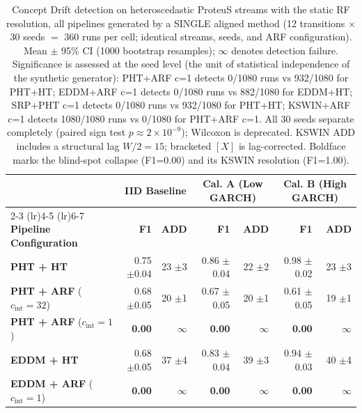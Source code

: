 \begin{table}[t]
  \centering
  \caption{Concept Drift detection on heteroscedastic ProteuS streams with the static RF resolution, all pipelines generated by a SINGLE aligned method (12 transitions $\times$ 30 seeds $=$ 360 runs per cell; identical streams, seeds, and ARF configuration). Mean $\pm$ 95\% CI (1000 bootstrap resamples); $\infty$ denotes detection failure. Significance is assessed at the seed level (the unit of statistical independence of the synthetic generator): PHT+ARF c=1 detects 0/1080 runs vs 932/1080 for PHT+HT; EDDM+ARF c=1 detects 0/1080 runs vs 882/1080 for EDDM+HT; SRP+PHT c=1 detects 0/1080 runs vs 932/1080 for PHT+HT; KSWIN+ARF c=1 detects 1080/1080 runs vs 0/1080 for PHT+ARF c=1. All 30 seeds separate completely (paired sign test $p \approx 2\times10^{-9}$); Wilcoxon is deprecated. KSWIN ADD includes a structural lag $W/2 = 15$; bracketed $[X]$ is lag-corrected. Boldface marks the blind-spot collapse (F1=0.00) and its KSWIN resolution (F1=1.00).}
  \label{tab:results_concept}
  \begin{tabular}{@{}lrrrrrr@{}}
    \toprule
                                                   & \multicolumn{2}{c}{\textbf{IID Baseline}} & \multicolumn{2}{c}{\textbf{Cal. A (Low GARCH)}} & \multicolumn{2}{c}{\textbf{Cal. B (High GARCH)}} \\
    \cmidrule(lr){2-3} \cmidrule(lr){4-5} \cmidrule(lr){6-7}
    \textbf{Pipeline Configuration}                & \textbf{F1} & \textbf{ADD} & \textbf{F1} & \textbf{ADD} & \textbf{F1} & \textbf{ADD} \\
    \midrule
    \textbf{PHT + HT}                              & 0.75 {\small $\pm$0.04} & 23 {\small $\pm$3} & 0.86 {\small $\pm$0.04} & 22 {\small $\pm$2} & 0.98 {\small $\pm$0.02} & 23 {\small $\pm$3} \\
    \textbf{PHT + ARF} ($c_{\mathrm{int}} = 32$)   & 0.68 {\small $\pm$0.05} & 20 {\small $\pm$1} & 0.67 {\small $\pm$0.05} & 20 {\small $\pm$1} & 0.61 {\small $\pm$0.05} & 19 {\small $\pm$1} \\
    \textbf{PHT + ARF} ($c_{\mathrm{int}} = 1$)    & \textbf{0.00} & $\infty$ & \textbf{0.00} & $\infty$ & \textbf{0.00} & $\infty$ \\
    \midrule
    \textbf{EDDM + HT}                             & 0.68 {\small $\pm$0.05} & 37 {\small $\pm$4} & 0.83 {\small $\pm$0.04} & 39 {\small $\pm$3} & 0.94 {\small $\pm$0.03} & 40 {\small $\pm$4} \\
    \textbf{EDDM + ARF} ($c_{\mathrm{int}} = 1$)   & \textbf{0.00} & $\infty$ & \textbf{0.00} & $\infty$ & \textbf{0.00} & $\infty$ \\

\end{tabular}
\end{table}
